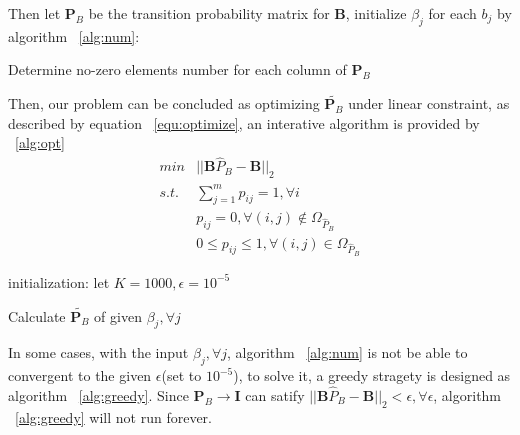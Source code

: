 \documentclass[11pt,a4paper]{article}
\begin{document}
Then let $\mathbf{P}_B$ be the transition probability matrix for $\mathbf{B}$,
initialize $\beta_j$ for each $b_j$ by algorithm ~\ref{alg:num}:

\begin{algorithm}[H]
\caption{Determine no-zero elements number for each column of $\mathbf{P}_B$}
\label{alg:num}
\end{algorithm}

Then, our problem can be concluded as optimizing $\widetilde{\mathbf{P}_B}$ under
linear constraint, as described by equation ~\ref{equ:optimize}, an interative algorithm is
provided by ~\ref{alg:opt}
\begin{equation}
\begin{split}
  min & ||\mathbf{B}\hat{P}_B-\mathbf{B}||_{2} \\
 s.t. & \sum_{j=1}^{m} p_{ij}=1, \forall i \\
      & p_{ij} = 0, \forall (i,j) \notin \Omega_{\hat{P}_B} \\
      & 0 \leq p_{ij} \leq 1, \forall (i,j) \in \Omega_{\hat{P}_B}
\end{split}
\label{equ:optimize}
\end{equation}

\begin{algorithm}[H]
  initialization: let $K=1000, \epsilon=10^{-5}$\;
  \caption{Calculate $\widetilde{\mathbf{P}_B}$ of given $\beta_j, \forall j$}
  \label{alg:opt}
\end{algorithm}

In some cases, with the input $\beta_j, \forall j$,  algorithm ~\ref{alg:num} is
not be able to convergent to the given $\epsilon$(set to $10^{-5}$), to solve it,
a greedy stragety is designed as algorithm ~\ref{alg:greedy}. Since 
$\mathbf{P}_B \to \mathbf{I}$ can satify 
$||\mathbf{B}\hat{P}_B-\mathbf{B}||_{2} < \epsilon, \forall \epsilon$,
algorithm ~\ref{alg:greedy} will not run forever.
\end{document}
